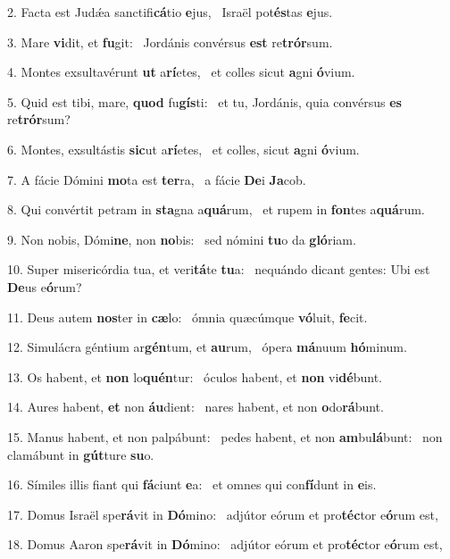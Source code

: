 2. Facta est Judǽa sanctifi\textbf{cá}tio \textbf{e}jus, \ast\  Israël pot\textbf{és}tas \textbf{e}jus.\

3. Mare \textbf{vi}dit, et \textbf{fu}git: \ast\  Jordánis convérsus \textbf{est} re\textbf{trór}sum.\

4. Montes exsultavérunt \textbf{ut} a\textbf{rí}etes, \ast\  et colles sicut \textbf{a}gni \textbf{ó}vium.\

5. Quid est tibi, mare, \textbf{quod} fu\textbf{gís}ti: \ast\  et tu, Jordánis, quia convérsus \textbf{es} re\textbf{trór}sum?\

6. Montes, exsultástis \textbf{sic}ut a\textbf{rí}etes, \ast\  et colles, sicut \textbf{a}gni \textbf{ó}vium.\

7. A fácie Dómini \textbf{mo}ta est \textbf{ter}ra, \ast\  a fácie \textbf{De}i \textbf{Ja}cob.\

8. Qui convértit petram in \textbf{sta}gna a\textbf{quá}rum, \ast\  et rupem in \textbf{fon}tes a\textbf{quá}rum.\

9. Non nobis, Dómi\textbf{ne}, non \textbf{no}bis: \ast\  sed nómini \textbf{tu}o da \textbf{gló}riam.\

10. Super misericórdia tua, et veri\textbf{tá}te \textbf{tu}a: \ast\  nequándo dicant gentes: Ubi est \textbf{De}us e\textbf{ó}rum?\

11. Deus autem \textbf{nos}ter in \textbf{cæ}lo: \ast\  ómnia quæcúmque \textbf{vó}luit, \textbf{fe}cit.\

12. Simulácra géntium ar\textbf{gén}tum, et \textbf{au}rum, \ast\  ópera \textbf{má}nuum \textbf{hó}minum.\

13. Os habent, et \textbf{non} lo\textbf{quén}tur: \ast\  óculos habent, et \textbf{non} vi\textbf{dé}bunt.\

14. Aures habent, \textbf{et} non \textbf{áu}dient: \ast\  nares habent, et non \textbf{o}do\textbf{rá}bunt.\

15. Manus habent, et non palpábunt: \dag\  pedes habent, et non \textbf{am}bu\textbf{lá}bunt: \ast\  non clamábunt in \textbf{gút}ture \textbf{su}o.\

16. Símiles illis fiant qui \textbf{fá}ciunt \textbf{e}a: \ast\  et omnes qui con\textbf{fí}dunt in \textbf{e}is.\

17. Domus Israël spe\textbf{rá}vit in \textbf{Dó}mino: \ast\  adjútor eórum et pro\textbf{téc}tor e\textbf{ó}rum est,\

18. Domus Aaron spe\textbf{rá}vit in \textbf{Dó}mino: \ast\  adjútor eórum et pro\textbf{téc}tor e\textbf{ó}rum est,\

